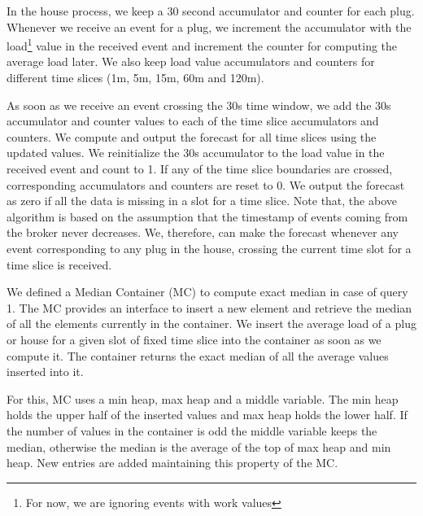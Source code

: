 In the house process, we keep a 30 second accumulator and counter for each plug.
Whenever we receive an event for a plug, we increment the accumulator with the load\footnote{For now, we are ignoring events with work values} value in the received event and increment the counter for computing the average load later.
We also keep load value accumulators and counters for different time slices (1m, 5m, 15m, 60m and 120m).


As soon as we receive an event crossing the 30s time window, we add the 30s accumulator and counter values to each of the time slice accumulators and counters. We compute and output the forecast for all time slices using the updated values.
We reinitialize the 30s accumulator to the load value in the received event and count to 1.
If any of the time slice boundaries are crossed, corresponding accumulators and counters are reset to 0.
We output the forecast as zero if all the data is missing in a slot for a time slice.
Note that, the above algorithm is based on the assumption that the timestamp of events coming from the broker never decreases.
We, therefore, can make the forecast whenever any event corresponding to any plug in the house, crossing the current time slot for a time slice is received.

We defined a Median Container (MC) to compute exact median in case of query 1.
The MC provides an interface to insert a new element and retrieve the median of all the elements currently in the container.
We insert the average load of a plug or house for a given slot of fixed time slice into the container as soon as we compute it.
The container returns the exact median of all the average values inserted into it.

For this, MC uses a min heap, max heap and a middle variable. The min heap holds the upper half of the inserted values and max heap holds the lower half. If the number of values in the container is odd the middle variable keeps the median, otherwise the median is the average of the top of max heap and min heap. New entries are added maintaining this property of the MC.

